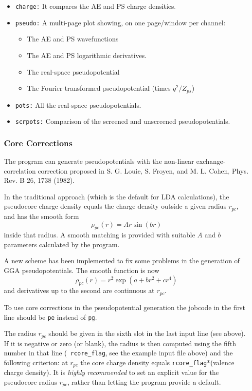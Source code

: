 \documentclass[11pt]{article}
\begin{document}
\begin{itemize}
\item {\tt charge:} It compares the AE and PS charge densities.
\item {\tt pseudo:} A multi-page plot showing, on one page/window per
channel:
\begin{itemize}
\item The AE and PS wavefunctions
\item The AE and PS logarithmic derivatives.
\item The real-space pseudopotential
\item The Fourier-transformed pseudopotential (times $q^2/Z_{ps}$)
\end{itemize}
\item {\tt pots:} All the real-space pseudopotentials.
\item {\tt scrpots:} Comparison of the screened and unscreened
pseudopotentials.
\end{itemize}

\subsubsection{Core Corrections}
\label{sec:cc}
The program can generate pseudopotentials with the non-linear
exchange-correlation correction proposed in S. G. Louie, S. Froyen,
and M. L. Cohen, Phys. Rev. B 26, 1738 (1982).

In the traditional approach (which is the default for LDA
calculations), the pseudocore charge density equals the charge density
outside a given radius $r_{pc}$, and has the smooth form
$$
\rho_{pc}(r) = A r   \sin(b r)
$$
inside that radius. A smooth matching is provided with suitable $A$ 
and $b$ parameters calculated by the program.

A new scheme has been implemented to fix some problems in the generation
of GGA pseudopotentials. The smooth function is now
$$
\rho_{pc}(r) =  r^2  \exp{(a + b r^2 +c r^4)}
$$
and derivatives up to the second are continuous  at $r_{pc}$.

To use core corrections in the pseudopotential generation
the jobcode in the first line should be {\tt pe} instead of {\tt pg}.

The radius $r_{pc}$ should be  given in the sixth slot in the last
input line (see above). If it is negative or zero (or blank), the
radius is then computed using the fifth number in that line ({\tt
rcore\_flag}, see the example input file above)
and the following criterion: at $r_{pc}$ the core charge density 
equals {\tt rcore\_flag}*(valence charge density).
It is {\it highly recommended} to set an explicit value for the pseudocore
radius $r_{pc}$, rather than letting the program provide a default.
\end{document}
